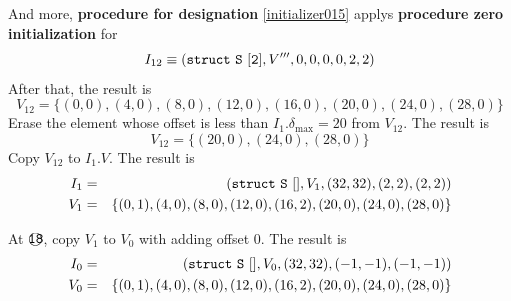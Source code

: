 \begin{Example}
And more, {\bf procedure for designation} \ref{initializer015}
applys {\bf procedure zero initialization} for
\[
I_{12} \equiv ({\tt{struct\,\,S\,\,[2]}},V''',0,0,0,0,2,2)
\]
After that, the result is
\[
V_{12}  = \{(0,0),(4,0),(8,0),(12,0),(16,0),(20,0),(24,0),(28,0) \}
\]
Erase the element whose offset is less than $I_1.\delta_{\max} = 20$ 
from $V_{12}$. The result is
\[
V_{12}  = \{(20,0), (24,0),(28,0) \} 
\]
Copy $V_{12}$ to $I_1.V$.
The result is
\begin{eqnarray*}
I_1 & = & ({\tt{struct\,\,S\,\,[]}},V_1,(32,32),(2,2),(2,2))  \\
 V_1 & = & \{(0,1),(4,0),(8,0),(12,0),(16,2),(20,0),(24,0),(28,0)\}
\end{eqnarray*}

\noindent
At $\MARU{\tt 18}$, copy $V_1$ to $V_0$ with adding offset $0$.
The result is
\begin{eqnarray*}
I_0 & = & ({\tt{struct\,\,S\,\,[]}},V_0,(32,32),(-1,-1),(-1,-1))  \\
 V_0 & = & \{(0,1),(4,0),(8,0),(12,0),(16,2),(20,0),(24,0),(28,0)\}
\end{eqnarray*}

\end{Example}
